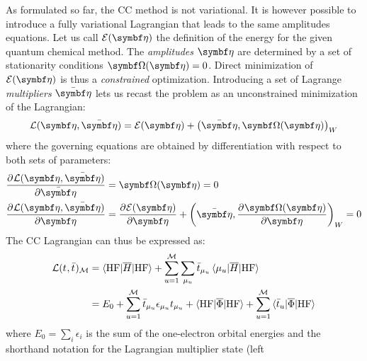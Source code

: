 As formulated so far, the \acrshort{CC} method is not variational.
It is however possible to introduce a fully variational Lagrangian that
leads to the same amplitudes equations.\autocite{Helgaker1982-xl, Arponen1983-qt,
Helgaker1988-to, Helgaker1989-wl, Koch1990-vr, Kvaal2013-jr}
Let us call $\mathcal{E}(\vect{\eta})$ the definition of the energy
for the given quantum chemical method.
The \emph{amplitudes} $\vect{\eta}$ are determined by a set of
stationarity conditions $\mat{\Omega}(\vect{\eta}) = 0$.
Direct minimization of $\mathcal{E}(\vect{\eta})$ is thus a
\emph{constrained} optimization.
Introducing a set of Lagrange \emph{multipliers} $\bar{\vect{\eta}}$
lets us recast the problem as an unconstrained minimization of the
Lagrangian:
\begin{equation}
  \mathcal{L}(\vect{\eta}, \bar{\vect{\eta}}) =
  \mathcal{E}(\vect{\eta}) +
  \scalprod[W]{\bar{\vect{\eta}}}{\mat{\Omega}(\vect{\eta})}
\end{equation}
where the governing equations are obtained by differentiation with
respect to both sets of parameters:
\begin{subequations}
  \begin{align}
    \pderiv{\mathcal{L}(\vect{\eta}, \bar{\vect{\eta}})}{\bar{\vect{\eta}}}
    &= \mat{\Omega}(\vect{\eta}) = 0 \\
    \pderiv{\mathcal{L}(\vect{\eta}, \bar{\vect{\eta}})}{\vect{\eta}}
    &= \pderiv{\mathcal{E}(\vect{\eta})}{\vect{\eta}} +
    \scalprod[W]{\bar{\vect{\eta}}}{\pderiv{\mat{\Omega(\vect{\eta})}}{\vect{\eta}}}
    = 0
  \end{align}
\end{subequations}
The \acrshort*{CC} Lagrangian can thus be expressed as:
\begin{equation}\label{eq:cc-lagrangian}
  \begin{aligned}
    \mathcal{L}(t_{}, \bar{t}_{})_\mathcal{M}
    &=
    \braket{\mathrm{HF} | \overline{H} | \mathrm{HF}}
    + \sum_{u=1}^{\mathcal{M}}\sum_{\mu_u}
    \bar{t}_{\mu_u}\braket{\mu_u | \overline{H} | \mathrm{HF}} \\
    &=
  E_0
  + \sum_{u=1}^{\mathcal{M}}\bar{t}_{\mu_u}\epsilon_{\mu_u}t_{\mu_u}
  + \braket{\mathrm{HF} | \overline{\Phi} | \mathrm{HF}}
  + \sum_{u=1}^{\mathcal{M}}\braket{\bar{t}_{u} | \overline{\Phi} | \mathrm{HF}}
  \end{aligned}
\end{equation}
where $E_0 = \sum_{i}\epsilon_i$ is the sum of the one-electron orbital
energies and the shorthand notation for the Lagrangian multiplier state (left

